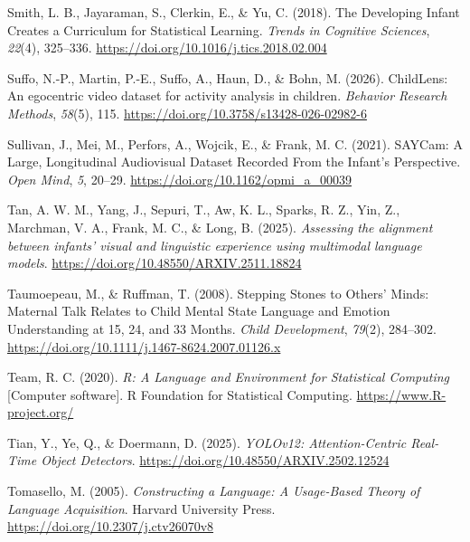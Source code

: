 \documentclass[
  english,
  12pt,
  man,floatsintext]{apa6}
\newlength{\cslhangindent}
\newenvironment{CSLReferences}[2] %
 {\begin{list}{}{%
  \setlength{\itemindent}{0pt}
  \setlength{\leftmargin}{0pt}
  \setlength{\parsep}{0pt}
  \ifodd #1
   \setlength{\leftmargin}{\cslhangindent}
   \setlength{\itemindent}{-1\cslhangindent}
  \fi
  \setlength{\itemsep}{#2\baselineskip}}}
 {\end{list}}
\begin{document}
\begin{CSLReferences}{1}{0}
Smith, L. B., Jayaraman, S., Clerkin, E., \& Yu, C. (2018). The {Developing Infant Creates} a {Curriculum} for {Statistical Learning}. \emph{Trends in Cognitive Sciences}, \emph{22}(4), 325--336. \url{https://doi.org/10.1016/j.tics.2018.02.004}

Suffo, N.-P., Martin, P.-E., Suffo, A., Haun, D., \& Bohn, M. (2026). {ChildLens}: {An} egocentric video dataset for activity analysis in children. \emph{Behavior Research Methods}, \emph{58}(5), 115. \url{https://doi.org/10.3758/s13428-026-02982-6}

Sullivan, J., Mei, M., Perfors, A., Wojcik, E., \& Frank, M. C. (2021). {SAYCam}: {A Large}, {Longitudinal Audiovisual Dataset Recorded From} the {Infant}'s {Perspective}. \emph{Open Mind}, \emph{5}, 20--29. \url{https://doi.org/10.1162/opmi_a_00039}

Tan, A. W. M., Yang, J., Sepuri, T., Aw, K. L., Sparks, R. Z., Yin, Z., Marchman, V. A., Frank, M. C., \& Long, B. (2025). \emph{Assessing the alignment between infants' visual and linguistic experience using multimodal language models}. \url{https://doi.org/10.48550/ARXIV.2511.18824}

Taumoepeau, M., \& Ruffman, T. (2008). Stepping {Stones} to {Others}' {Minds}: {Maternal Talk Relates} to {Child Mental State Language} and {Emotion Understanding} at 15, 24, and 33 {Months}. \emph{Child Development}, \emph{79}(2), 284--302. \url{https://doi.org/10.1111/j.1467-8624.2007.01126.x}

Team, R. C. (2020). \emph{R: {A Language} and {Environment} for {Statistical Computing}} {[}Computer software{]}. R Foundation for Statistical Computing. \url{https://www.R-project.org/}

Tian, Y., Ye, Q., \& Doermann, D. (2025). \emph{{YOLOv12}: {Attention-Centric Real-Time Object Detectors}}. \url{https://doi.org/10.48550/ARXIV.2502.12524}

Tomasello, M. (2005). \emph{Constructing a {Language}: {A Usage-Based Theory} of {Language Acquisition}}. Harvard University Press. \url{https://doi.org/10.2307/j.ctv26070v8}


\end{CSLReferences}
\end{document}
